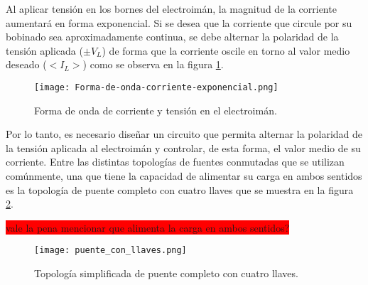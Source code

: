 Al aplicar tensión en los bornes del electroimán, la magnitud de la corriente aumentará en forma exponencial. Si se desea que la corriente que circule por su bobinado sea aproximadamente continua, se debe alternar la polaridad de la tensión aplicada ($\pm V_L$) de forma que la corriente oscile en torno al valor medio deseado ($<I_L>$) como se observa en la figura \ref{fig:img_corriente_exponencial}.

\begin{figure}[H]
	\centering
	\texttt{[image: Forma-de-onda-corriente-exponencial.png]}
	\caption{Forma de onda de corriente y tensión en el electroimán.}
	\label{fig:img_corriente_exponencial}
\end{figure}



Por lo tanto, es necesario diseñar un circuito que permita alternar la polaridad de la tensión aplicada al electroimán y controlar, de esta forma, el valor medio de su corriente. Entre las distintas topologías de fuentes conmutadas que se utilizan comúnmente, una que tiene la capacidad de alimentar su carga en ambos sentidos es la topología de puente completo con cuatro llaves que se muestra en la figura \ref{fig:img_topologia_simplificada}.

\colorbox{red}{vale la pena mencionar que alimenta la carga en ambos sentidos?}

\begin{figure}[H]
	\centering
	\texttt{[image: puente\_con\_llaves.png]}
	\caption{Topología simplificada de puente completo con cuatro llaves.}
	\label{fig:img_topologia_simplificada}
\end{figure} 


